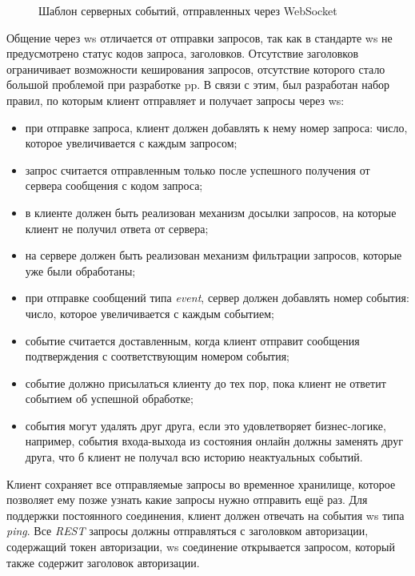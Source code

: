 \begin{figure}[h]
	
   \caption{Шаблон серверных событий, отправленных через WebSocket}
   \label{sec:development:arch:pp:communication:code:ws:response}
\end{figure}

Общение через \gls{ws} отличается от отправки запросов, так как в стандарте \gls{ws} не предусмотрено статус кодов запроса, заголовков. Отсутствие заголовков ограничивает возможности кеширования запросов, отсутствие которого стало большой проблемой при разработке \gls{pp}. В связи с этим, был разработан набор правил, по которым клиент отправляет и получает запросы через \gls{ws}:

\begin{itemize}
	\item при отправке запроса, клиент должен добавлять к нему номер запроса: число, которое увеличивается с каждым запросом;
	\item запрос считается отправленным только после успешного получения от сервера сообщения с кодом запроса;
	\item в клиенте должен быть реализован механизм досылки запросов, на которые клиент не получил ответа от сервера;
	\item на сервере должен быть реализован механизм фильтрации запросов, которые уже были обработаны;
	\item при отправке сообщений типа \textit{event}, сервер должен добавлять номер события: число, которое увеличивается с каждым событием;
	\item событие считается доставленным, когда клиент отправит сообщения подтверждения с соответствующим номером события;
	\item событие должно присылаться клиенту до тех пор, пока клиент не ответит событием об успешной обработке;
	\item события могут удалять друг друга, если это удовлетворяет бизнес-логике, например, события входа-выхода из состояния онлайн должны заменять друг друга, что б клиент не получал всю историю неактуальных событий.
\end{itemize}

Клиент сохраняет все отправляемые запросы во временное хранилище, которое позволяет ему позже узнать какие запросы нужно отправить ещё раз. Для поддержки постоянного соединения, клиент должен отвечать на события \gls{ws} типа \textit{ping}. Все \textit{REST} запросы должны отправляться с заголовком авторизации, содержащий токен авторизации, \gls{ws} соединение открывается запросом, который также содержит заголовок авторизации.